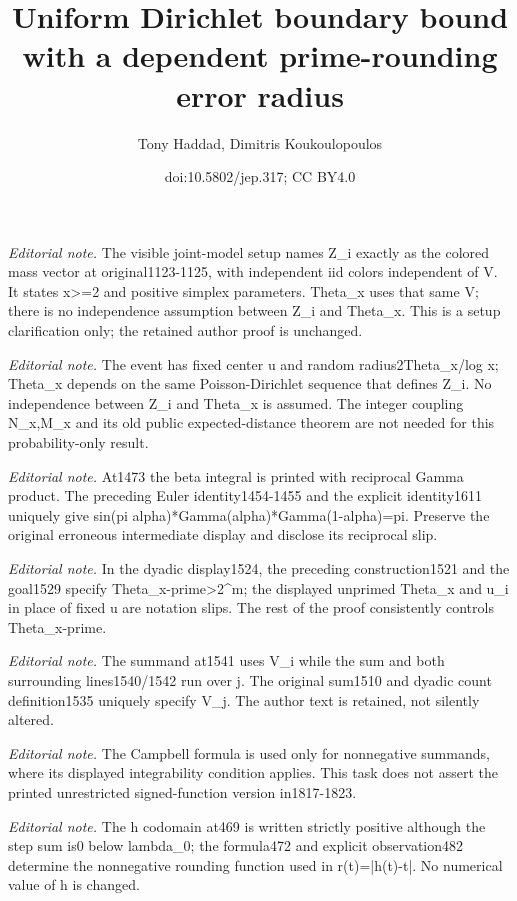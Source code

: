 \documentclass[10pt,a4paper]{article}
\title{Uniform Dirichlet boundary bound with a dependent prime-rounding error radius}
\author{Tony Haddad, Dimitris Koukoulopoulos}
\date{doi:10.5802/jep.317; CC BY4.0}
\theoremstyle{plain}
\theoremstyle{definition}
\begin{document}
\maketitle
\noindent\textit{Editorial note.} The visible joint-model setup names Z\_i exactly as the colored mass vector at original1123-1125, with independent iid colors independent of V. It states x>=2 and positive simplex parameters. Theta\_x uses that same V; there is no independence assumption between Z\_i and Theta\_x. This is a setup clarification only; the retained author proof is unchanged.\par\medskip
\noindent\textit{Editorial note.} The event has fixed center u and random radius2Theta\_x/log x; Theta\_x depends on the same Poisson-Dirichlet sequence that defines Z\_i. No independence between Z\_i and Theta\_x is assumed. The integer coupling N\_x,M\_x and its old public expected-distance theorem are not needed for this probability-only result.\par\medskip
\noindent\textit{Editorial note.} At1473 the beta integral is printed with reciprocal Gamma product. The preceding Euler identity1454-1455 and the explicit identity1611 uniquely give sin(pi alpha)*Gamma(alpha)*Gamma(1-alpha)=pi. Preserve the original erroneous intermediate display and disclose its reciprocal slip.\par\medskip
\noindent\textit{Editorial note.} In the dyadic display1524, the preceding construction1521 and the goal1529 specify Theta\_x-prime>2\textasciicircum{}m; the displayed unprimed Theta\_x and u\_i in place of fixed u are notation slips. The rest of the proof consistently controls Theta\_x-prime.\par\medskip
\noindent\textit{Editorial note.} The summand at1541 uses V\_i while the sum and both surrounding lines1540/1542 run over j. The original sum1510 and dyadic count definition1535 uniquely specify V\_j. The author text is retained, not silently altered.\par\medskip
\noindent\textit{Editorial note.} The Campbell formula is used only for nonnegative summands, where its displayed integrability condition applies. This task does not assert the printed unrestricted signed-function version in1817-1823.\par\medskip
\noindent\textit{Editorial note.} The h codomain at469 is written strictly positive although the step sum is0 below lambda\_0; the formula472 and explicit observation482 determine the nonnegative rounding function used in r(t)=|h(t)-t|. No numerical value of h is changed.\par\medskip
\end{document}
